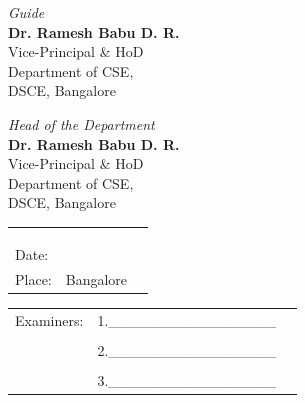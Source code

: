 \vfill

\begin{minipage}[t]{0.5\textwidth}
    \begin{flushleft}
        \emph{Guide}\\
        \textbf{Dr. Ramesh Babu D. R.}\\
        Vice-Principal \& HoD\\
        Department of CSE,\\
        DSCE, Bangalore\\
    \end{flushleft}
\end{minipage}
\begin{minipage}[t]{0.5\textwidth}
    \begin{flushright}
        \emph{Head of the Department}\\
        \textbf{Dr. Ramesh Babu D. R.}\\
        Vice-Principal \& HoD\\
        Department of CSE,\\
        DSCE, Bangalore\\
    \end{flushright}
\end{minipage}

\vfill

\begin{minipage}[t]{0.5\textwidth}
    \begin{flushleft}
        \vfill
        \begin{tabular}{lcc}
            &  & \tabularnewline
            &  & \tabularnewline
            &  & \tabularnewline
            Date: & \tabularnewline
            Place: & Bangalore\tabularnewline
        \end{tabular}
    \end{flushleft}
\end{minipage}
\begin{minipage}[t]{0.5\textwidth}
    \begin{flushright}
        \noindent
        \begin{tabular}{ccr}
            Examiners:& 1.\_\_\_\_\_\_\_\_\_\_\_\_\_\_\_\_ \\
            & \\
            & 2.\_\_\_\_\_\_\_\_\_\_\_\_\_\_\_\_ \\
            & \\
            & 3.\_\_\_\_\_\_\_\_\_\_\_\_\_\_\_\_ \\
        \end{tabular}
    \end{flushright}
\end{minipage}